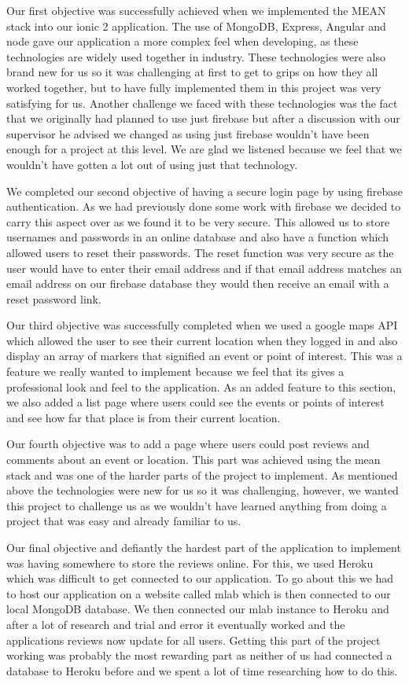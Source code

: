 Our first objective was successfully achieved when we implemented the MEAN stack into our ionic 2 application. The use of MongoDB, Express, Angular and node gave our application a more complex feel when developing, as these technologies are widely used together in industry. These technologies were also brand new for us so it was challenging at first to get to grips on how they all worked together, but to have fully implemented them in this project was very satisfying for us. Another challenge we faced with these technologies was the fact that we originally had planned to use just firebase but after a discussion with our supervisor he advised we changed as using just firebase wouldn't have been enough for a project at this level. We are glad we listened because we feel that we wouldn't have gotten a lot out of using just that technology.

We completed our second objective of having a secure login page by using firebase authentication. As we had previously done some work with firebase we decided to carry this aspect over as we found it to be very secure. This allowed us to store usernames and passwords in an online database and also have a function which allowed users to reset their passwords. The reset function was very secure as the user would have to enter their email address and if that email address matches an email address on our firebase database they would then receive an email with a reset password link.

Our third objective was successfully completed when we used a google maps API which allowed the user to see their current location when they logged in and also display an array of markers that signified an event or point of interest. This was a feature we really wanted to implement because we feel that its gives a professional look and feel to the application. As an added feature to this section, we also added a list page where users could see the events or points of interest and see how far that place is from their current location.

Our fourth objective was to add a page where users could post reviews and comments about an event or location. This part was achieved using the mean stack and was one of the harder parts of the project to implement. As mentioned above the technologies were new for us so it was challenging, however, we wanted this project to challenge us as we wouldn't have learned anything from doing a project that was easy and already familiar to us.

Our final objective and defiantly the hardest part of the application to implement was having somewhere to store the reviews online. For this, we used Heroku which was difficult to get connected to our application. To go about this we had to host our application on a website called mlab which is then connected to our local MongoDB database. We then connected our mlab instance to Heroku and after a lot of research and trial and error it eventually worked and the applications reviews now update for all users. Getting this part of the project working was probably the most rewarding part as neither of us had connected a database to Heroku before and we spent a lot of time researching how to do this.

